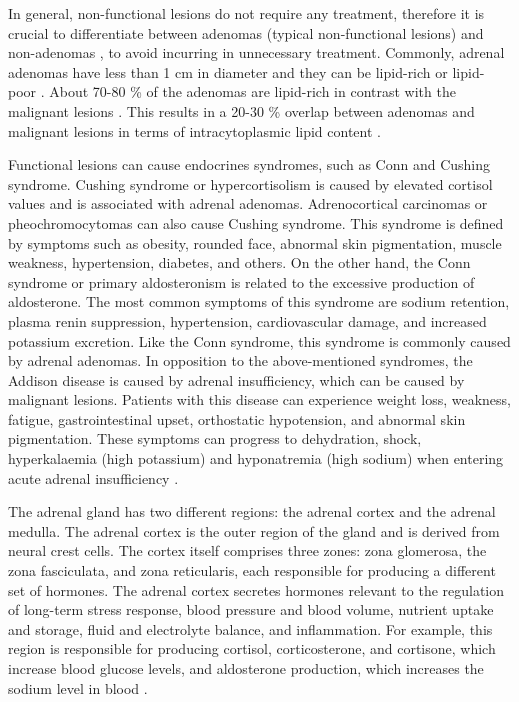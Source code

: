 \documentclass[11pt]{article}
\begin{document}
In general, non-functional lesions do not require any treatment, therefore it is
crucial to differentiate between adenomas (typical non-functional lesions) and
non-adenomas \cite{Platzek2019}, to avoid incurring in unnecessary treatment.
Commonly, adrenal adenomas have less than 1 cm in
diameter and they can be lipid-rich or lipid-poor \cite{Panda2015}.
About 70-80 \% of the adenomas are lipid-rich in contrast with the malignant
lesions \cite{Platzek2019}. This results in a 20-30 \% overlap between adenomas
and malignant lesions in terms of intracytoplasmic lipid content
\cite{Israel2004}.

Functional lesions can cause endocrines syndromes, such as
Conn and Cushing syndrome. Cushing syndrome or hypercortisolism is caused by
elevated cortisol values and is associated with adrenal adenomas. Adrenocortical carcinomas or pheochromocytomas can also cause Cushing syndrome.
This syndrome is defined by symptoms such as obesity, rounded face, abnormal
skin pigmentation, muscle weakness, hypertension, diabetes, and others. On the
other hand, the Conn syndrome or primary aldosteronism is related to the
excessive production of aldosterone. The most common symptoms of this syndrome
are sodium retention, plasma renin suppression, hypertension, cardiovascular
damage, and increased potassium excretion. Like the Conn syndrome, this syndrome
is commonly caused by adrenal adenomas.  In opposition to the above-mentioned
syndromes, the Addison disease is caused by adrenal insufficiency, which can be
caused by malignant lesions. Patients with this disease can experience weight
loss, weakness, fatigue, gastrointestinal upset, orthostatic hypotension, and
abnormal skin pigmentation. These symptoms can progress to dehydration, shock,
hyperkalaemia (high potassium) and hyponatremia (high sodium) when entering
acute adrenal insufficiency \cite{Wang2018}.

The adrenal gland has two different regions: the adrenal cortex and the adrenal
medulla. The adrenal cortex is the outer region of the gland and is derived from
neural crest cells. The cortex itself comprises three zones: zona glomerosa, the
zona fasciculata, and zona reticularis, each responsible for producing a
different set of hormones. The adrenal cortex secretes hormones relevant to the
regulation of long-term stress response, blood pressure and blood volume,
nutrient uptake and storage, fluid and electrolyte balance, and inflammation.
For example, this region is responsible for producing cortisol, corticosterone,
and cortisone, which increase blood glucose levels, and aldosterone production,
which increases the sodium level in blood \cite{open}.
\end{document}
